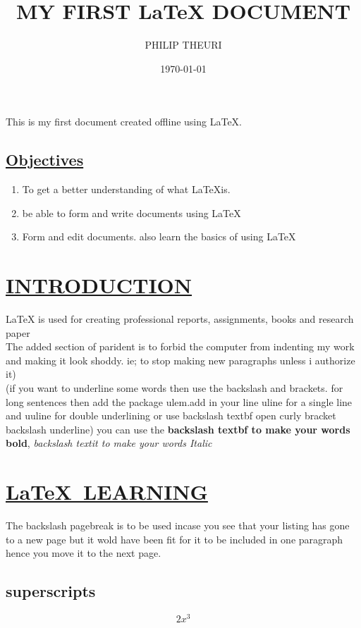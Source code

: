 \documentclass[a4paper,12pt]{article}
\title{MY FIRST \LaTeX{} DOCUMENT}
\author{PHILIP THEURI}
\date{\today}
\begin{document}
	\tableofcontents
		\maketitle
	
	This is my first document created offline using \LaTeX{}.
	
	\subsection{\underline{Objectives}}
	\begin{enumerate}
	 \item To get a better understanding of what \LaTeX is.
	\item be able to form and write documents using \LaTeX
	\item Form and edit documents. also learn the basics of using \LaTeX
	\end{enumerate}
	\section{\underline{INTRODUCTION}}
	
	\LaTeX{} is used for creating professional reports, assignments, books and research paper\\
	
	The added section of parident is to forbid the computer from indenting my work and making it look shoddy. ie; to stop making new paragraphs unless i authorize it)\\
	(if you want to underline some words then use the backslash and brackets. for long sentences then add the package ulem.add in your line uline for a single line and uuline for double underlining or use backslash textbf open curly bracket backslash underline)
	you can use the \textbf{backslash textbf to make your words bold}, \textit{backslash textit to make your words Italic}
	
	\section{\underline{\LaTeX\ LEARNING}}
	
	The backslash pagebreak is to be used incase you see that your listing has gone to a new page but it wold have been fit for it to be included in one paragraph hence you move it to the next page.
	\subsection{superscripts}
	$$2x^3$$
	
\end{document}
